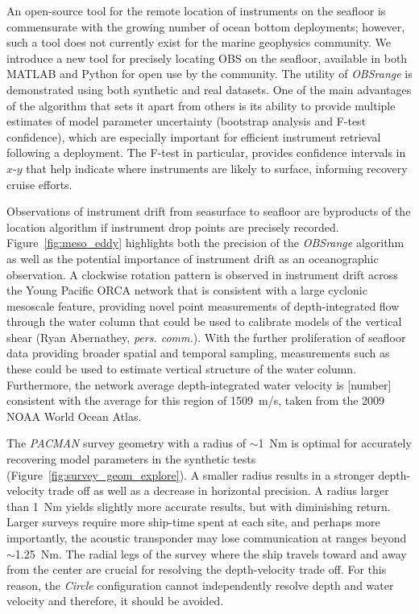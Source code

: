 An open-source tool for the remote location of instruments on the seafloor is commensurate with the growing number of ocean bottom deployments; however, such a tool does not currently exist for the marine geophysics community. We introduce a new tool for precisely locating OBS on the seafloor, available in both MATLAB and Python for open use by the community. The utility of \textit{OBSrange} is demonstrated using both synthetic and real datasets. One of the main advantages of the algorithm that sets it apart from others is its ability to provide multiple estimates of model parameter uncertainty (bootstrap analysis and F-test confidence), which are especially important for efficient instrument retrieval following a deployment. The F-test in particular, provides confidence intervals in $x$-$y$ that help indicate where instruments are likely to surface, informing recovery cruise efforts.

Observations of instrument drift from seasurface to seafloor are byproducts of the location algorithm if instrument drop points are precisely recorded. Figure~\ref{fig:meso_eddy} highlights both the precision of the \textit{OBSrange} algorithm as well as the potential importance of instrument drift as an oceanographic observation. A clockwise rotation pattern is observed in instrument drift across the Young Pacific ORCA network that is consistent with a large cyclonic mesoscale feature, providing novel point measurements of depth-integrated flow through the water column that could be used to calibrate models of the vertical shear (Ryan Abernathey, \textit{pers. comm.}). With the further proliferation of seafloor data providing broader spatial and temporal sampling, measurements such as these could be used to estimate vertical structure of the water column. Furthermore, the network average depth-integrated water velocity is [number] consistent with the average for this region of 1509~m/s, taken from the 2009 NOAA World Ocean Atlas.

The \textit{PACMAN} survey geometry with a radius of $\sim$1~Nm is optimal for accurately recovering model parameters in the synthetic tests (Figure~\ref{fig:survey_geom_explore}). A smaller radius results in a stronger depth-velocity trade off as well as a decrease in horizontal precision. A radius larger than 1~Nm yields slightly more accurate results, but with diminishing return. Larger surveys require more ship-time spent at each site, and perhaps more importantly, the acoustic transponder may lose communication at ranges beyond $\sim$1.25~Nm. The radial legs of the survey where the ship travels toward and away from the center are crucial for resolving the depth-velocity trade off. For this reason, the \textit{Circle} configuration cannot independently resolve depth and water velocity and therefore, it should be avoided. 

